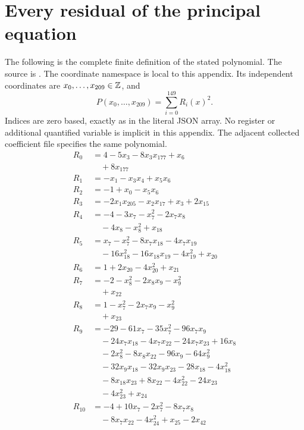\appendix
\section{Every residual of the principal equation}
\label{sec:residuals}
The following is the complete finite definition of the stated polynomial.
The source is . The coordinate namespace is local to this appendix.
Its independent coordinates are $x_0,\ldots,x_{209}\in\mathbb Z$, and
\[P(x_0,\ldots,x_{209})=\sum_{i=0}^{149}R_i(x)^2.\]
Indices are zero based, exactly as in the literal JSON array. No register
or additional quantified variable is implicit in this appendix. The
adjacent collected coefficient file specifies the same polynomial.
\begingroup\small\setlength{\jot}{0.5pt}\allowdisplaybreaks[4]
\begin{align*}
R_{0}&=4-5x_{3}-8x_{3}x_{177}+x_{6}\\
&\quad{}+8x_{177}\\
R_{1}&=-x_{1}-x_{3}x_{4}+x_{5}x_{6}\\
R_{2}&=-1+x_{0}-x_{5}x_{6}\\
R_{3}&=-2x_{1}x_{205}-x_{2}x_{17}+x_{3}+2x_{15}\\
R_{4}&=-4-3x_{7}-x_{7}^{2}-2x_{7}x_{8}\\
&\quad{}-4x_{8}-x_{8}^{2}+x_{18}\\
R_{5}&=x_{7}-x_{7}^{2}-8x_{7}x_{18}-4x_{7}x_{19}\\
&\quad{}-16x_{18}^{2}-16x_{18}x_{19}-4x_{19}^{2}+x_{20}\\
R_{6}&=1+2x_{20}-4x_{20}^{2}+x_{21}\\
R_{7}&=-2-x_{8}^{2}-2x_{8}x_{9}-x_{9}^{2}\\
&\quad{}+x_{22}\\
R_{8}&=1-x_{7}^{2}-2x_{7}x_{9}-x_{9}^{2}\\
&\quad{}+x_{23}\\
R_{9}&=-29-61x_{7}-35x_{7}^{2}-96x_{7}x_{9}\\
&\quad{}-24x_{7}x_{18}-4x_{7}x_{22}-24x_{7}x_{23}+16x_{8}\\
&\quad{}-2x_{8}^{2}-8x_{8}x_{22}-96x_{9}-64x_{9}^{2}\\
&\quad{}-32x_{9}x_{18}-32x_{9}x_{23}-28x_{18}-4x_{18}^{2}\\
&\quad{}-8x_{18}x_{23}+8x_{22}-4x_{22}^{2}-24x_{23}\\
&\quad{}-4x_{23}^{2}+x_{24}\\
R_{10}&=-4+10x_{7}-2x_{7}^{2}-8x_{7}x_{8}\\
&\quad{}-8x_{7}x_{22}-4x_{24}^{2}+x_{25}-2x_{42}\\

\end{align*}
